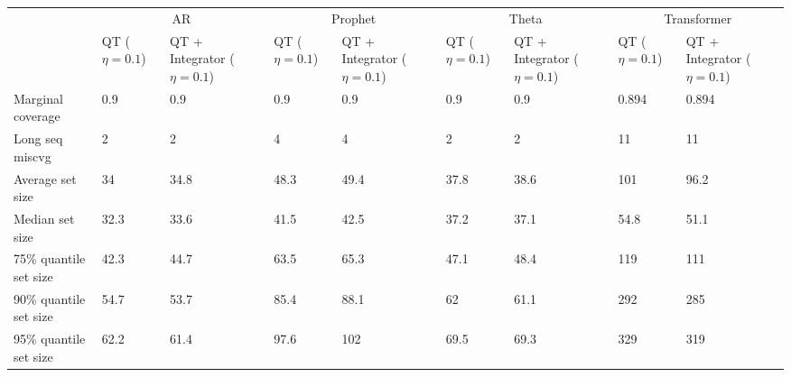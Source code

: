 \begin{tabular}{lllllllll}
\toprule
& \multicolumn{2}{c}{AR}& \multicolumn{2}{c}{Prophet}& \multicolumn{2}{c}{Theta}& \multicolumn{2}{c}{Transformer} \\
& QT ($\eta=0.1$) & QT + Integrator ($\eta=0.1$) & QT ($\eta=0.1$) & QT + Integrator ($\eta=0.1$) & QT ($\eta=0.1$) & QT + Integrator ($\eta=0.1$) & QT ($\eta=0.1$) & QT + Integrator ($\eta=0.1$) \\
\midrule
Marginal coverage & 0.9 & 0.9 & 0.9 & 0.9 & 0.9 & 0.9 & 0.894 & 0.894 \\
Long seq miscvg & 2 & 2 & 4 & 4 & 2 & 2 & 11 & 11 \\
Average set size & 34 & 34.8 & 48.3 & 49.4 & 37.8 & 38.6 & 101 & 96.2 \\
Median set size & 32.3 & 33.6 & 41.5 & 42.5 & 37.2 & 37.1 & 54.8 & 51.1 \\
75\% quantile set size & 42.3 & 44.7 & 63.5 & 65.3 & 47.1 & 48.4 & 119 & 111 \\
90\% quantile set size & 54.7 & 53.7 & 85.4 & 88.1 & 62 & 61.1 & 292 & 285 \\
95\% quantile set size & 62.2 & 61.4 & 97.6 & 102 & 69.5 & 69.3 & 329 & 319 \\
\bottomrule
\end{tabular}
